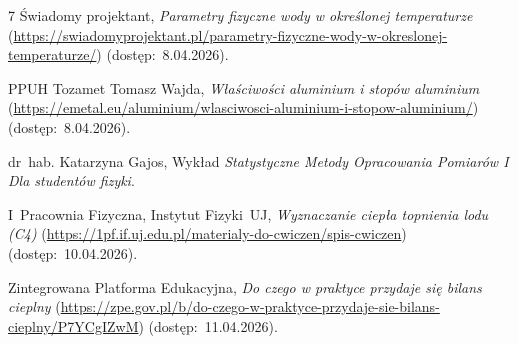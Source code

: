 \documentclass[twocolumn, a4paper, polish, 10pt]{article}
\begin{document}
\begin{thebibliography}{7}
     Świadomy projektant, \emph{Parametry fizyczne wody w określonej temperaturze} (\url{https://swiadomyprojektant.pl/parametry-fizyczne-wody-w-okreslonej-temperaturze/}) (dostęp:~8.04.2026).

     PPUH Tozamet Tomasz Wajda, \emph{Właściwości aluminium i stopów aluminium} (\url{https://emetal.eu/aluminium/wlasciwosci-aluminium-i-stopow-aluminium/}) (dostęp:~8.04.2026).

     dr~hab. \mbox{Katarzyna} \mbox{Gajos}, Wykład \emph{Statystyczne Metody Opracowania Pomiarów I Dla studentów fizyki}.

     I~Pracownia Fizyczna, Instytut Fizyki~UJ, \emph{Wyznaczanie ciepła topnienia lodu (C4)} (\url{https://1pf.if.uj.edu.pl/materialy-do-cwiczen/spis-cwiczen}) (dostęp:~10.04.2026).

     Zintegrowana Platforma Edukacyjna, \emph{Do czego w praktyce przydaje się bilans cieplny} (\url{https://zpe.gov.pl/b/do-czego-w-praktyce-przydaje-sie-bilans-cieplny/P7YCgIZwM}) (dostęp:~11.04.2026).
\end{thebibliography}
\end{document}
